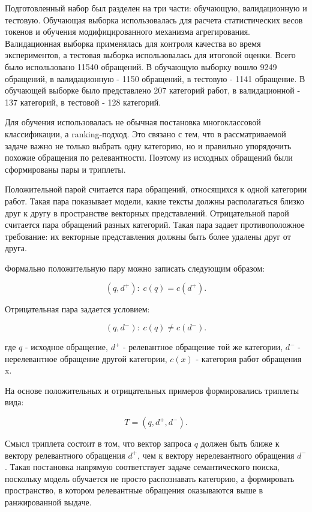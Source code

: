 \documentclass[14pt,a4paper]{extarticle}
\numberwithin{figure}{section}
\numberwithin{table}{section}
\begin{document}
Подготовленный набор был разделен на три части: обучающую, валидационную
и тестовую. Обучающая выборка использовалась для расчета статистических
весов токенов и обучения модифицированного механизма агрегирования.
Валидационная выборка применялась для контроля качества во время
экспериментов, а тестовая выборка использовалась для итоговой оценки.
Всего было использовано 11540 обращений. В обучающую выборку вошло 9249
обращений, в валидационную - 1150 обращений, в тестовую - 1141
обращение. В обучающей выборке было представлено 207 категорий работ, в
валидационной - 137 категорий, в тестовой - 128 категорий.

Для обучения использовалась не обычная постановка многоклассовой
классификации, а ranking-подход. Это связано с тем, что в
рассматриваемой задаче важно не только выбрать одну категорию, но и
правильно упорядочить похожие обращения по релевантности.
Поэтому из исходных обращений были сформированы пары и триплеты.

Положительной парой считается пара обращений, относящихся к одной
категории работ. Такая пара показывает модели, какие тексты должны
располагаться близко друг к другу в пространстве векторных представлений.
Отрицательной парой считается пара обращений разных категорий. Такая
пара задает противоположное требование: их векторные представления
должны быть более удалены друг от друга.

Формально положительную пару можно записать следующим образом:

\begin{equation}(q,d^+):\;c(q)=c(d^+).\label{eq:positive-pair}\end{equation}

Отрицательная пара задается условием:

\begin{equation}(q,d^-):\;c(q)\ne c(d^-).\label{eq:negative-pair}\end{equation}

где \(q\) - исходное обращение, \(d^{+}\) - релевантное обращение той же
категории, \(d^{-}\) - нерелевантное обращение другой категории, \(c(x)\)
- категория работ обращения x.

На основе положительных и отрицательных примеров формировались триплеты
вида:

\begin{equation}T=(q,d^+,d^-).\label{eq:triplet}\end{equation}

Смысл триплета состоит в том, что вектор запроса \(q\) должен быть ближе
к вектору релевантного обращения \(d^{+}\), чем к вектору
нерелевантного обращения \(d^{-}\). Такая постановка напрямую
соответствует задаче семантического поиска, поскольку модель обучается
не просто распознавать категорию, а формировать пространство, в котором
релевантные обращения оказываются выше в ранжированной выдаче.
\end{document}
